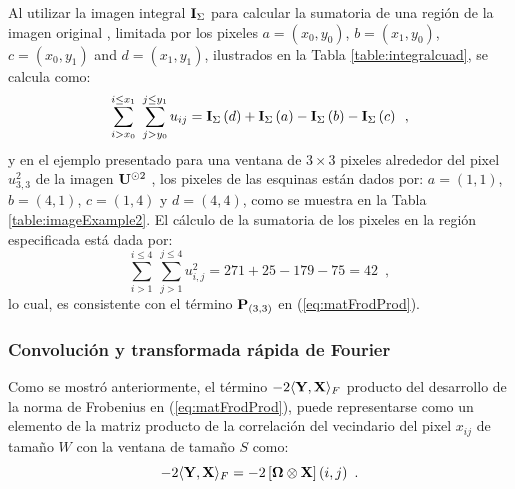 Al utilizar la imagen integral $\mathbf{I}_{\Sigma}$ para calcular la sumatoria de una región de la imagen original , limitada por los pixeles $a=\left(x_{0},y_{0}\right)$,
$b=\left(x_{1},y_{0}\right)$, $c=\left(x_{0},y_{1}\right)$ and $d=\left(x_{1},y_{1}\right)$, ilustrados en la Tabla \ref{table:integralcuad}, se calcula como: 
%
\begin{equation}
\sum_{i>x_{0}}^{i\leq x_{1}}~\sum_{j>y_{0}}^{j\leq y_{1}}u_{ij}=\mathbf{I}_{\Sigma}\left(d\right)+\mathbf{I}_{\Sigma}\left(a\right)-\mathbf{I}_{\Sigma}\left(b\right)-\mathbf{I}_{\Sigma}\left(c\right) \enspace ,
\end{equation}
%
y en el ejemplo presentado para una ventana de $3\times3$ pixeles alrededor del pixel $u_{3,3}^2$ de la imagen $\mathbf{U}^{\odot2}$ , los pixeles de las esquinas están dados por: $a=\left(1,1\right)$, $b=\left(4,1\right)$,
$c=\left(1,4\right)$ y $d=\left(4,4\right)$, como se muestra en la Tabla \ref{table:imageExample2}. El cálculo de la sumatoria de los pixeles en la región especificada está dada por: 
%
\begin{equation}
\sum_{i>1}^{i\leq 4}~\sum_{j>1}^{j\leq 4}u_{i,j}^2=271+25-179-75=42 \enspace ,
\end{equation}
%
lo cual, es consistente con el término $\mathbf{P}_{\left(3,3\right)}$ en (\ref{eq:matFrodProd}). 



\subsubsection{Convolución y transformada rápida de Fourier}

Como se mostró anteriormente, el término $-2\langle\mathbf{Y},\mathbf{X}\rangle_{F}$ producto del desarrollo de la norma de Frobenius en (\ref{eq:matFrodProd}), puede representarse como un elemento de la matriz producto de la correlación del vecindario  del pixel $x_{ij}$ de tama\~no $W$ con la ventana \mat{\Omega} de tama\~no $S$ como:
%
\begin{equation}
-2\langle\mathbf{Y},\mathbf{X}\rangle_{F} = -2\left[\mathbf{\Omega} \otimes \mathbf{X}\right](i,j) \enspace .
\end{equation}

